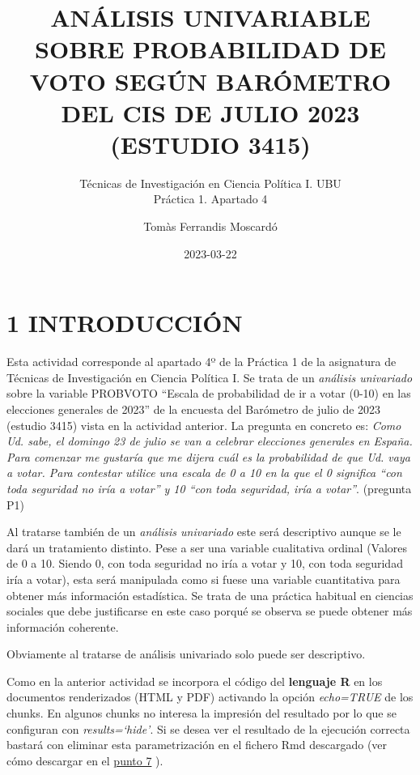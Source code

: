 \documentclass[
  12 pt,
  a4paper,
]{article}
\title{ANÁLISIS UNIVARIABLE SOBRE PROBABILIDAD DE VOTO SEGÚN BARÓMETRO
DEL CIS DE JULIO 2023\\
(ESTUDIO 3415)}
\subtitle{Técnicas de Investigación en Ciencia Política I. UBU\\
Práctica 1. Apartado 4}
\author{Tomàs Ferrandis Moscardó}
\date{2023-03-22}
\begin{document}
\maketitle

{
\setcounter{tocdepth}{2}
\tableofcontents
}
\newpage

\renewcommand\tablename{Tabla}

\hypertarget{introducciuxf3n}{%
\section{1 INTRODUCCIÓN}\label{introducciuxf3n}}

Esta actividad corresponde al apartado 4º de la Práctica 1 de la
asignatura de Técnicas de Investigación en Ciencia Política I. Se trata
de un \emph{análisis univariado} sobre la variable PROBVOTO ``Escala de
probabilidad de ir a votar (0-10) en las elecciones generales de 2023''
de la encuesta del Barómetro de julio de 2023 (estudio 3415) vista en la
actividad anterior. La pregunta en concreto es: \emph{Como Ud. sabe, el
domingo 23 de julio se van a celebrar elecciones generales en España.
Para comenzar me gustaría que me dijera cuál es la probabilidad de que
Ud. vaya a votar. Para contestar utilice una escala de 0 a 10 en la que
el 0 significa ``con toda seguridad no iría a votar'' y 10 ``con toda
seguridad, iría a votar''}. (pregunta P1)

Al tratarse también de un \emph{análisis univariado} este será
descriptivo aunque se le dará un tratamiento distinto. Pese a ser una
variable cualitativa ordinal (Valores de 0 a 10. Siendo 0, con toda
seguridad no iría a votar y 10, con toda seguridad iría a votar), esta
será manipulada como si fuese una variable cuantitativa para obtener más
información estadística. Se trata de una práctica habitual en ciencias
sociales que debe justificarse en este caso porqué se observa se puede
obtener más información coherente.

Obviamente al tratarse de análisis univariado solo puede ser
descriptivo.

Como en la anterior actividad se incorpora el código del
\textbf{lenguaje R} en los documentos renderizados (HTML y PDF)
activando la opción \emph{echo=TRUE} de los chunks. En algunos chunks no
interesa la impresión del resultado por lo que se configuran con
\emph{results=`hide'}. Si se desea ver el resultado de la ejecución
correcta bastará con eliminar esta parametrización en el fichero Rmd
descargado (ver cómo descargar en el \protect\hyperlink{id-github}{punto
7} ).
\end{document}
